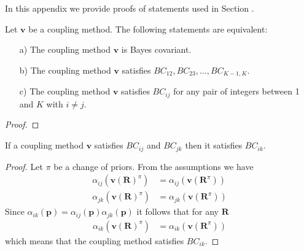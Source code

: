 \appendix

\section{}
\label{app:bc1}

In this appendix we provide proofs of statements used in Section \label{sec:bc2}.

\begin{prop}
	Let $\boldsymbol{v}$ be a coupling method. The following statements are equivalent:
	\begin{itemize}
		\item[a)] The coupling method $\boldsymbol{v}$ is Bayes covariant.
		\item[b)] The coupling method $\boldsymbol{v}$ satisfies $BC_{12}, BC_{23}, \ldots, BC_{K-1,K}$.
		\item[c)] The coupling method $\boldsymbol{v}$ satisfies $BC_{ij}$ for any pair of integers between 1 and $K$ with $i\not= j$.
	\end{itemize}
\end{prop}
\begin{proof}
	
\end{proof}

\begin{lem} \label{lem:transitivity}
	If a coupling method $\boldsymbol{v}$ satisfies $BC_{ij}$ and $BC_{jk}$ then it satisfies $BC_{ik}$.
\end{lem}
\begin{proof}
	Let $\pi$ be a change of priors. From the assumptions we have 
	\begin{align}
		\alpha_{ij}(\boldsymbol{v}(\boldsymbol{R})^\pi ) &= \alpha_{ij}(\boldsymbol{v}(\boldsymbol{R}^\pi) ) \\
		\alpha_{jk}(\boldsymbol{v}(\boldsymbol{R})^\pi ) &= \alpha_{jk}(\boldsymbol{v}(\boldsymbol{R}^\pi) )
	\end{align}
	Since $\alpha_{ik}(\boldsymbol{p}) = \alpha_{ij}(\boldsymbol{p})  \alpha_{jk}(\boldsymbol{p})$ it follows that for any $\boldsymbol{R}$
	\begin{align}
		\alpha_{ik}(\boldsymbol{v}(\boldsymbol{R})^\pi ) &= \alpha_{ik}(\boldsymbol{v}(\boldsymbol{R}^\pi) )
	\end{align}
	which means that the coupling method satisfies $BC_{ik}$.
\end{proof}


\section{}
\label{app:explicit}

